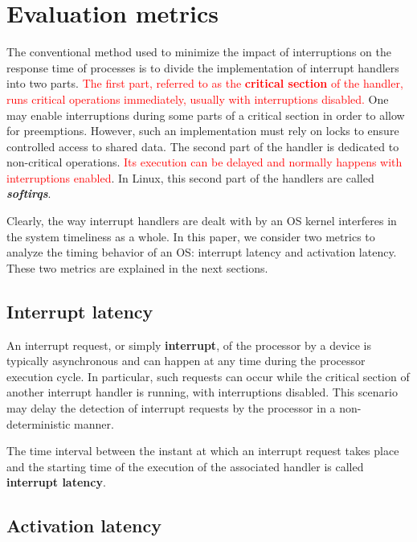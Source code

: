 \documentclass{acm_proc_article-sp}
\newcommand{\col}[1]{\textcolor{red}{#1}}
\begin{document}
\section{Evaluation metrics}
\label{sec:compTemp}

The conventional method used to minimize the impact of interruptions on the response
time of processes is to divide the implementation of interrupt handlers into two
parts. \col{The first part, referred to as the \textbf{critical section} of the
  handler, runs critical operations immediately, %
  usually with interruptions disabled.}  One may enable interruptions during some
parts of a critical section in order to allow for preemptions. However, such an
implementation must rely on locks to ensure controlled access to shared data. The
second part of the handler is dedicated to non-critical operations. \col{Its execution
can be delayed and normally happens with interruptions enabled}. In Linux, this
second part of the handlers are called \textbf{\emph{softirqs}}.

Clearly, the way interrupt handlers are dealt with by an OS kernel interferes in the
system timeliness as a whole. In this paper, we consider two metrics to analyze the
timing behavior of an OS: interrupt latency and activation latency. These two
metrics are explained in the next sections.

\subsection{Interrupt latency}
\label{sec:latIRQ}

An interrupt request, or simply \textbf{interrupt}, of the processor by a device
is typically asynchronous and can happen at any time during the processor execution
cycle. In particular, such requests can occur while the critical section of another
interrupt handler is running, with interruptions disabled. This scenario may delay 
the detection of interrupt requests by the processor in a non-deterministic manner.

The time interval between the instant at which an interrupt request takes place and the
starting time of the execution of the associated handler is called \textbf{interrupt
  latency}. 

\subsection{Activation latency}
\label{sec:latAtiv}
\end{document}
